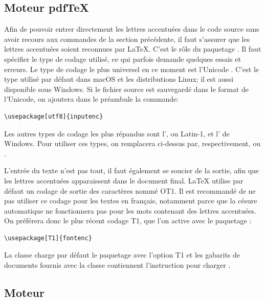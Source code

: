 \subsection{Moteur pdf\TeX}
\label{sec:bases:francais:pdftex}

Afin de pouvoir entrer directement les lettres accentuées dans le code
source sans avoir recours aux commandes de la section précédente, il
faut s'assurer que les lettres accentuées soient reconnues par
{\LaTeX}. C'est le rôle du paquetage  \citep{inputenc}.
Il faut spécifier le type de codage utilisé, ce qui parfois demande
quelques essais et erreurs. Le type de codage le plus universel en ce
moment est l'Unicode \citep{Unicode:5.0}. C'est le type utilisé par
défaut dans macOS et les distributions Linux; il est aussi
disponible sous Windows. Si le fichier source est sauvegardé dans le
format %
de l'Unicode, on ajoutera dans le préambule la commande:
\begin{lstlisting}
\usepackage[utf8]{inputenc}
\end{lstlisting}

Les autres types de codage les plus répandus sont
l', ou
Latin-1, et l'
de Windows. Pour utiliser ces types, on remplacera 
ci-dessus par, respectivement,  ou .

L'entrée du texte n'est pas tout, il faut également se soucier de la
sortie, afin que les lettres accentuées apparaissent dans le document
final. {\LaTeX} utilise par défaut un codage de sortie des caractères
nommé OT1. Il est recommandé de ne pas utiliser ce codage pour les
textes en français, notamment parce que la césure automatique ne
fonctionnera pas pour les mots contenant des lettres accentuées. On
préférera donc le plus récent codage T1, que l'on active avec le
paquetage  \citep{fontenc}:
\begin{lstlisting}
\usepackage[T1]{fontenc}
\end{lstlisting}

La classe  charge par défaut le paquetage 
avec l'option T1 et les gabarits de documents fournis avec la classe
contiennent l'instruction pour charger .

\subsection{Moteur \XeTeX}
\label{sec:bases:francais:xetex}

